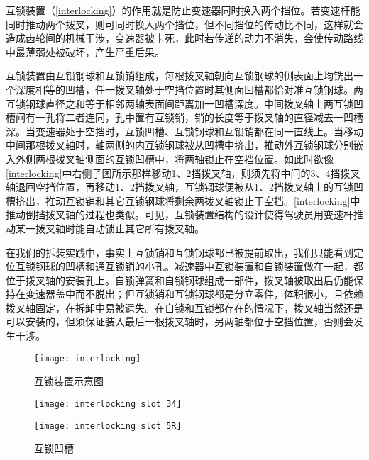 \documentclass[UTF8]{ctexart}
\numberwithin{figure}{section}
\numberwithin{table}{section}
\begin{document}
互锁装置（\cref{interlocking}）的作用就是防止变速器同时换入两个挡位。若变速杆能同时推动两个拨叉，则可同时换入两个挡位，但不同挡位的传动比不同，这样就会造成齿轮间的机械干涉，变速器被卡死，此时若传递的动力不消失，会使传动路线中最薄弱处被破坏，产生严重后果。

互锁装置由互锁钢球和互锁销组成，每根拨叉轴朝向互锁钢球的侧表面上均铣出一个深度相等的凹槽，任一拨叉轴处于空挡位置时其侧面凹槽都恰对准互锁钢球。两互锁钢球直径之和等于相邻两轴表面间距离加一凹槽深度。中间拨叉轴上两互锁凹槽间有一孔将二者连同，孔中置有互锁销，销的长度等于拨叉轴的直径减去一凹槽深。当变速器处于空挡时，互锁凹槽、互锁钢球和互锁销都在同一直线上。当移动中间那根拨叉轴时，轴两侧的内互锁钢球被从凹槽中挤出，推动外互锁钢球分别嵌入外侧两根拨叉轴侧面的互锁凹槽中，将两轴锁止在空挡位置。如此时欲像\cref{interlocking}中右侧子图所示那样移动1、2挡拨叉轴，则须先将中间的3、4挡拨叉轴退回空挡位置，再移动1、2挡拨叉轴，互锁钢球便被从1、2挡拨叉轴上的互锁凹槽挤出，推动互锁销和其它互锁钢球将剩余两拨叉轴锁止于空挡。\cref{interlocking}中推动倒挡拨叉轴的过程也类似。可见，互锁装置结构的设计使得驾驶员用变速杆推动某一拨叉轴时能自动锁止其它所有拨叉轴。

在我们的拆装实践中，事实上互锁销和互锁钢球都已被提前取出，我们只能看到定位互锁钢球的凹槽和通互锁销的小孔。减速器中互锁装置和自锁装置做在一起，都位于拨叉轴的安装孔上。自锁弹簧和自锁钢球组成一部件，拨叉轴被取出后仍能保持在变速器盖中而不脱出；但互锁销和互锁钢球都是分立零件，体积很小，且依赖拨叉轴固定，在拆卸中易被遗失。在自锁和互锁都存在的情况下，拨叉轴当然还是可以安装的，但须保证装入最后一根拨叉轴时，另两轴都位于空挡位置，否则会发生干涉。

\begin{figure}[htbp]
	\centering
	\begin{minipage}[b]{0.65\textwidth}
		\centering
		\texttt{[image: interlocking]}
		\caption{互锁装置示意图}
		\label{interlocking}
	\end{minipage}
	\begin{minipage}[b]{0.3\textwidth}
		\centering
		\begin{minipage}[b]{0.8\textwidth}
			\centering
			\texttt{[image: interlocking slot 34]}
		\end{minipage}
		\begin{minipage}[b]{0.8\textwidth}
			\centering
			\texttt{[image: interlocking slot 5R]}
		\end{minipage}
		\caption{互锁凹槽}
		\label{interlocking slots}
	\end{minipage}
\end{figure}
\end{document}
